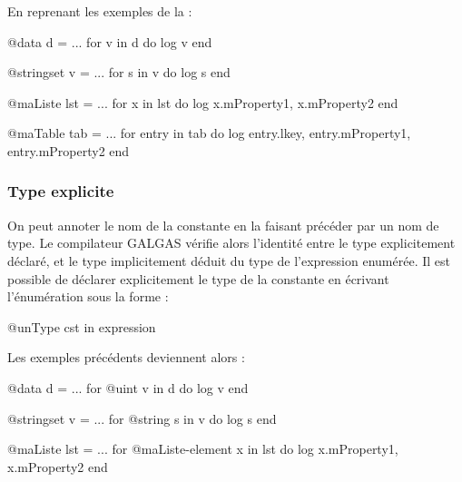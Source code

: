 {En reprenant les exemples de la  :

\begin{galgascode}
@data d = ...
for v in d do
  log v
end
\end{galgascode}



\begin{galgascode}
@stringset v = ...
for s in v do
  log s
end
\end{galgascode}


\begin{galgascode}
@maListe lst = ...
for x in lst do
  log x.mProperty1, x.mProperty2
end
\end{galgascode}


\begin{galgascode}
@maTable tab = ...
for entry in tab do
  log entry.lkey, entry.mProperty1, entry.mProperty2
end
\end{galgascode}

\subsubsection{Type explicite}

On peut annoter le nom de la constante en la faisant précéder par un nom de type. Le compilateur GALGAS vérifie alors l'identité entre le type explicitement déclaré, et le type implicitement déduit du type de l'expression enumérée. Il est possible de déclarer explicitement le type de la constante en écrivant l'énumération sous la forme :

\begin{galgascode}
@unType cst in expression
\end{galgascode}

Les exemples précédents deviennent alors :

\begin{galgascode}
@data d = ...
for @uint v in d do
  log v
end
\end{galgascode}



\begin{galgascode}
@stringset v = ...
for @string s in v do
  log s
end
\end{galgascode}


\begin{galgascode}
@maListe lst = ...
for @maListe-element x in lst do
  log x.mProperty1, x.mProperty2
end
\end{galgascode}


}
